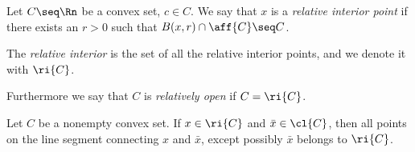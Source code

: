 \begin{definition}
    
    Let $C \seq \Rn$ be a convex set, $c \in C$. We say that $x$ is a \emph{relative interior point} if there exists an $r > 0$ such that $B(x,r) \cap \aff{C} \seq C$. 

    The \emph{relative interior} is the set of all the relative interior points, and we denote it with $\ri{C}$.

    Furthermore we say that $C$ is \emph{relatively open} if $C = \ri{C}$.

\end{definition}

\begin{proposition}

    Let $C$ be a nonempty convex set. If $x \in \ri{C}$ and $\bar{x} \in \cl{C}$, then all points on the line segment connecting $x$ and $\bar{x}$, except possibly $\bar{x}$ belongs to $\ri{C}$.
    
\end{proposition}

